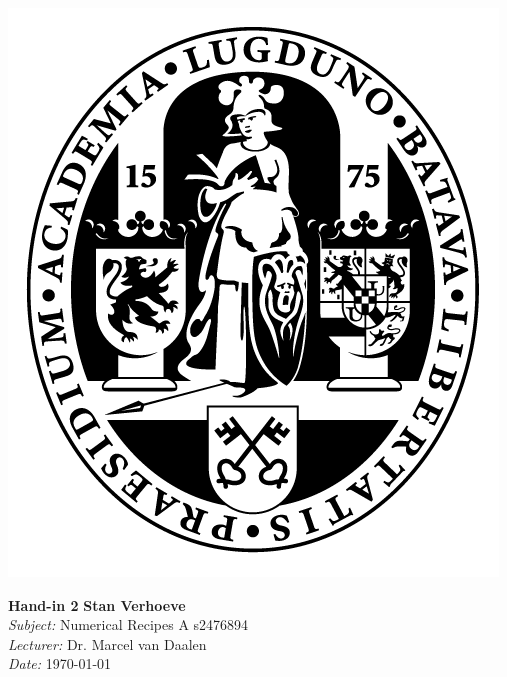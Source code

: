 \documentclass[hidelinks,a4paper,11pt]{article}
\begin{document}
\parbox{0.11\textwidth}{\includegraphics[width=\linewidth]{UL.png}}
\hspace{0.5cm}
\parbox{0.89\textwidth - 0.5cm}{
	\Large\textbf{Hand-in 2} \hspace*{\fill} \normalsize\textbf{Stan Verhoeve}\\
	\textit{Subject:} Numerical Recipes A \hspace*{\fill}s2476894\\
	\textit{Lecturer:} Dr. Marcel van Daalen\\
	\textit{Date:} \today
}





\end{document}
